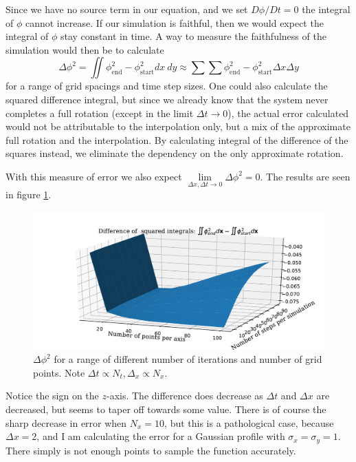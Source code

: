 \documentclass[sigconf]{acmart}
\begin{document}
Since we have no source term in our equation, and we set $ D\phi/Dt = 0$ the integral of $ \phi $ cannot increase. If our simulation is faithful, then we would expect the integral of $ \phi $ stay constant in time. A way to measure the faithfulness of the simulation would then be to calculate
\begin{equation}\label{key}
	\Delta\phi^2 = \iint \phi_{\text{end}}^2 - \phi_{\text{start}}^2 dx\ dy \approx \sum\sum \phi_{\text{end}}^2 - \phi_{\text{start}}^2 \Delta x \Delta y
\end{equation}
for a range of grid spacings and time step sizes. One could also calculate the squared difference integral, but since we already know that the system never completes a full rotation (except in the limit $ \Delta t \to 0 $), the actual error calculated would not be attributable to the interpolation only, but a mix of the approximate full rotation and the interpolation. By calculating integral of the difference of the squares instead, we eliminate the dependency on the only approximate rotation.

With this measure of error we also expect $ \lim\limits_{\Delta x, \Delta t \to 0} \Delta \phi^2 = 0 $. The results are seen in figure \ref{fig:semi_lagrange_error}.
\begin{figure}
	\includegraphics[width=\linewidth]{semi_lagrange_ex1.pdf}
	\caption{$ \Delta \phi^2 $ for a range of different number of iterations and number of grid points. Note $ \Delta t \propto N_t, \Delta_x \propto N_x $.}
	\label{fig:semi_lagrange_error}
\end{figure}
Notice the sign on the $ z $-axis. The difference does decrease as $ \Delta t $ and $ \Delta x $ are decreased, but seems to taper off towards some value. There is of course the sharp decrease in error when $ N_x = 10 $, but this is a pathological case, because $ \Delta x = 2$, and I am calculating the error for a Gaussian profile with $ \sigma_x=\sigma_y = 1 $. There simply is not enough points to sample the function accurately.
\end{document}
